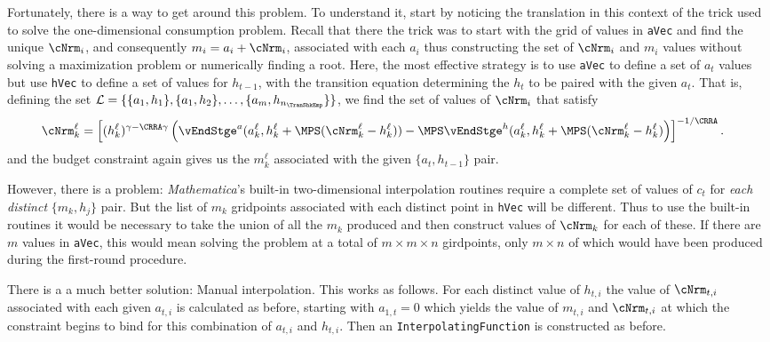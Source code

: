 \documentclass[titlepage, headings=optiontotocandhead]{\econtex}
\newcommand{\Mma}{\textit{Mathematica}}
\begin{document}
{  Fortunately, there is a way to get around this problem.  To
  understand it, start by noticing the translation in this context of
  the trick used to solve the one-dimensional consumption problem.
  Recall that there the trick was to start with the grid of values in
  \texttt{aVec} and find the unique ${\cNrm}_{i}$, and
  consequently ${m}_{i}={a}_{i}+{\cNrm}_{i}$, associated with
  each ${a}_{i}$ thus constructing the set of ${\cNrm}_{i}$ and
  ${m}_{i}$ values without solving a maximization problem or
  numerically finding a root.  Here, the most effective strategy is to
  use \texttt{aVec} to define a set of ${a}_{t}$ values but use
  \texttt{hVec} to define a set of values for $h_{t-1}$, with the
  transition equation determining the $h_{t}$ to be paired with the
  given ${a}_{t}$.  That is, defining the set $\mathcal{L} =
  \{\{{a}_{1},h_{1}\},\{{a}_{1},h_{2}\},\ldots,\{{a}_{m},h_{n_{\TranShkEmp}}\}\}$,
  we find the set of values of ${\cNrm}_{i}$ that satisfy
  \begin{equation}\begin{gathered}\begin{aligned}
        {\cNrm}_{k}^{\ell}  & = \left[(h_{k}^{\ell})^{\gamma-\CRRA\gamma}
          \left(\vEndStge^{{a}}({a}_{k}^{\ell},h_{k}^{\ell}
            +\MPS({\cNrm}_{k}^{\ell}-h_{k}^{\ell}))
            -\MPS
            \vEndStge^{h}({a}_{k}^{\ell},h_{k}^{\ell}+\MPS({\cNrm}_{k}^{\ell}-h_{k}^{\ell})\right)
        \right]^{-1/\CRRA}. \nonumber
      \end{aligned}\end{gathered}\end{equation}
  and the budget constraint again gives us the ${m}_{k}^{\ell}$
  associated with the given $\{{a}_{t},h_{t-1}\}$ pair.

  However, there is a problem: {\Mma}'s built-in two-dimensional
  interpolation routines require a complete set of values of ${c}_{t}$
  for \textit{each distinct} $\{{m}_{k},h_{j}\}$ pair.  But the list of
  ${m}_{k}$ gridpoints associated with each distinct point in
  \texttt{hVec} will be different.  Thus to use the built-in routines
  it would be necessary to take the union of all the ${m}_{k}$
  produced and then construct values of ${\cNrm}_{k}$ for each of
  these.  If there are $m$ values in \texttt{aVec}, this would
  mean solving the problem at a total of $m \times m \times n$
  girdpoints, only $m \times n$ of which would have been produced
  during the first-round procedure.

  There is a a much better solution: Manual interpolation.  This works
  as follows.  For each distinct value of $h_{t,i}$ the value of
  ${\cNrm}_{t,i}$ associated with each given ${a}_{t,i}$ is
  calculated as before, starting with ${a}_{1,t}=0$ which yields
  the value of ${m}_{t,i}$ and ${\cNrm}_{t,i}$ at which the
  constraint begins to bind for this combination of ${a}_{t,i}$
  and $h_{t,i}$.  Then an \texttt{InterpolatingFunction} is
  constructed as before.

}
\end{document}
